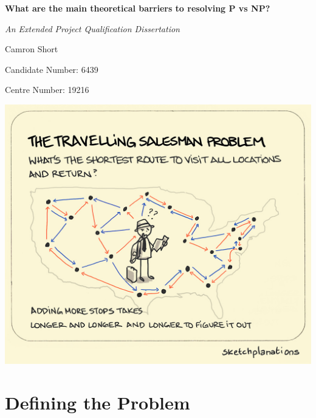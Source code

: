 \documentclass[12pt]{report}
\begin{document}
\begin{titlepage}
    \centering
    \vspace*{1cm}
    {\Huge\bfseries What are the main theoretical barriers to resolving P vs NP?\par}
    \vspace{1.5cm}
    {\Large\itshape An Extended Project Qualification Dissertation\par}
    \vspace{2cm}
    {\Large Camron Short\par}
    {\large Candidate Number: 6439\par}
    {\large Centre Number: 19216\par}
    \vspace{0.7cm}
    \includegraphics[width=1\textwidth]{CoverPhoto.jpg}
    \thispagestyle{empty}
\end{titlepage}

\chapter{Defining the Problem}
\end{document}
